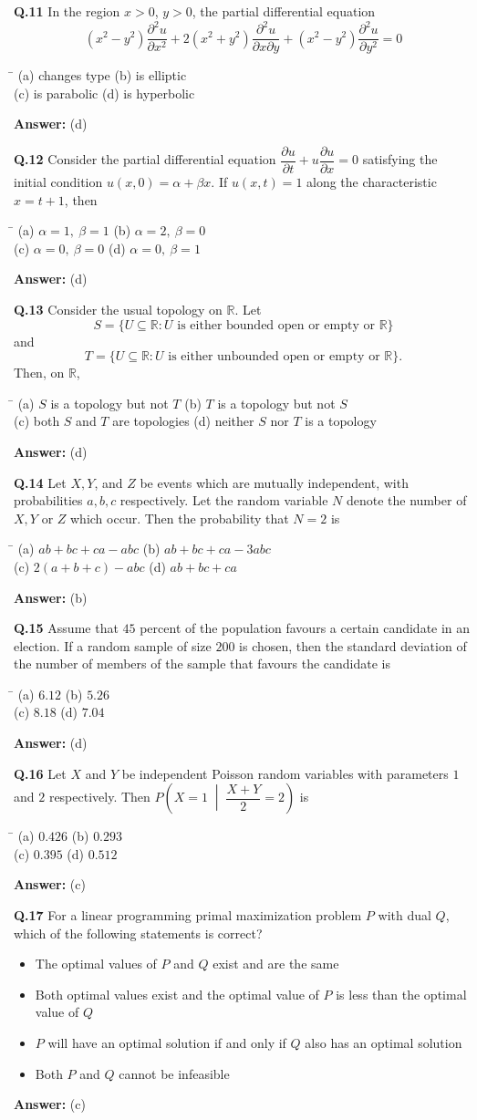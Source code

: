 \documentclass[11pt,a4paper]{article}
\newcommand{\optsfour}[4]{%
  \begin{tabbing}
    \hspace{0.48\linewidth}\=\kill
    (a) #1 \> (b) #2 \\[2pt]
    (c) #3 \> (d) #4
  \end{tabbing}%
}
\newcommand{\optslist}[4]{%
  \begin{itemize}
    \setlength{\itemsep}{2pt}\setlength{\parskip}{0pt}
    \item[(a)] #1
    \item[(b)] #2
    \item[(c)] #3
    \item[(d)] #4
  \end{itemize}%
}
\newcommand{\ans}[1]{\textbf{Answer:} #1\par\medskip}
\begin{document}
\textbf{Q.11} In the region $x > 0$, $y > 0$, the partial differential equation
\[
  (x^2 - y^2)\frac{\partial^2 u}{\partial x^2} + 2(x^2 + y^2)\frac{\partial^2 u}{\partial x \partial y} + (x^2 - y^2)\frac{\partial^2 u}{\partial y^2} = 0
\]
\optsfour{changes type}{is elliptic}{is parabolic}{is hyperbolic}
\ans{(d)}

\textbf{Q.12} Consider the partial differential equation $\dfrac{\partial u}{\partial t} + u\dfrac{\partial u}{\partial x} = 0$ satisfying the initial condition $u(x,0) = \alpha + \beta x$. If $u(x,t) = 1$ along the characteristic $x = t + 1$, then
\optsfour{$\alpha = 1,\ \beta = 1$}{$\alpha = 2,\ \beta = 0$}{$\alpha = 0,\ \beta = 0$}{$\alpha = 0,\ \beta = 1$}
\ans{(d)}

\textbf{Q.13} Consider the usual topology on $\mathbb{R}$. Let
\[
  S = \{U \subseteq \mathbb{R} : U \text{ is either bounded open or empty or } \mathbb{R}\}
\]
and
\[
  T = \{U \subseteq \mathbb{R} : U \text{ is either unbounded open or empty or } \mathbb{R}\}.
\]
Then, on $\mathbb{R}$,
\optsfour{$S$ is a topology but not $T$}{$T$ is a topology but not $S$}{both $S$ and $T$ are topologies}{neither $S$ nor $T$ is a topology}
\ans{(d)}

\textbf{Q.14} Let $X, Y$, and $Z$ be events which are mutually independent, with probabilities $a, b, c$ respectively. Let the random variable $N$ denote the number of $X, Y$ or $Z$ which occur. Then the probability that $N = 2$ is
\optsfour{$ab + bc + ca - abc$}{$ab + bc + ca - 3abc$}{$2(a + b + c) - abc$}{$ab + bc + ca$}
\ans{(b)}

\textbf{Q.15} Assume that $45$ percent of the population favours a certain candidate in an election. If a random sample of size $200$ is chosen, then the standard deviation of the number of members of the sample that favours the candidate is
\optsfour{$6.12$}{$5.26$}{$8.18$}{$7.04$}
\ans{(d)}

\textbf{Q.16} Let $X$ and $Y$ be independent Poisson random variables with parameters $1$ and $2$ respectively. Then $P\!\left(X = 1 \;\middle|\; \dfrac{X + Y}{2} = 2\right)$ is
\optsfour{$0.426$}{$0.293$}{$0.395$}{$0.512$}
\ans{(c)}

\textbf{Q.17} For a linear programming primal maximization problem $P$ with dual $Q$, which of the following statements is correct?
\optslist{The optimal values of $P$ and $Q$ exist and are the same}{Both optimal values exist and the optimal value of $P$ is less than the optimal value of $Q$}{$P$ will have an optimal solution if and only if $Q$ also has an optimal solution}{Both $P$ and $Q$ cannot be infeasible}
\ans{(c)}
\end{document}
